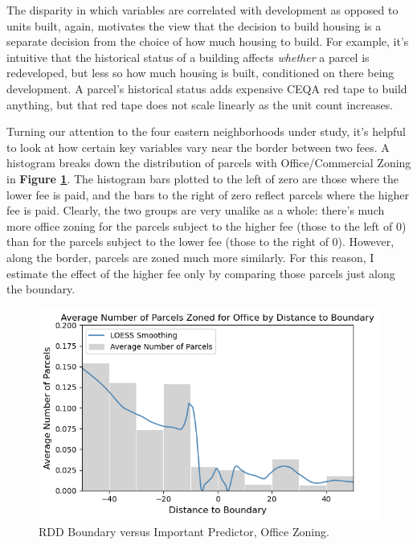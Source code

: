 \documentclass[a4paper,12pt]{article}
\begin{document}
The disparity in which variables are correlated with development as opposed to units built, again, motivates the view that the decision to build housing is a separate decision from the choice of how much housing to build. For example, it's intuitive that the historical status of a building affects \textit{whether} a parcel is redeveloped, but less so how much housing is built, conditioned on there being development. A parcel's historical status adds expensive CEQA red tape to build anything, but that red tape does not scale linearly as the unit count increases.

Turning our attention to the four eastern neighborhoods under study, it's helpful to look at how certain key variables vary near the border between two fees. A histogram breaks down the distribution of parcels with Office/Commercial Zoning in \textbf{Figure \ref{fig:office_zoning_boundary}}. The histogram bars plotted to the left of zero are those where the lower fee is paid, and the bars to the right of zero reflect parcels where the higher fee is paid. Clearly, the two groups are very unalike as a whole: there's much more office zoning for the parcels subject to the higher fee (those to the left of 0) than for the parcels subject to the lower fee (those to the right of 0). However, along the border, parcels are zoned much more similarly. For this reason, I estimate the effect of the higher fee only by comparing those parcels just along the boundary.

\begin{figure}[hbtp]
    \centering
    \includegraphics[scale=.8]{rdd/office_zoning_boundary.png}
    \caption{RDD Boundary versus Important Predictor, Office Zoning.}
    \label{fig:office_zoning_boundary}
\end{figure}
\end{document}
